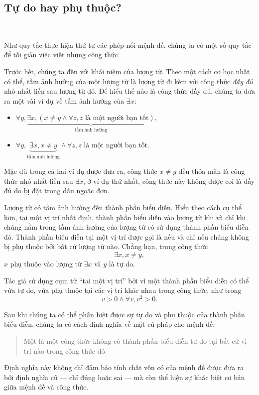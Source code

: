 \subsection{Tự do hay phụ thuộc?}

\ 

Như quy tắc thực hiện thứ tự các phép nối mệnh đề, chúng ta có một số quy tắc để tối giản việc viết những công thức.

Trước hết, chúng ta đến với khái niệm  của lượng từ. Theo một cách cơ học nhất có thể, tầm ảnh hưởng của một lượng từ là lượng từ đi kèm với công thức \emph{đầy đủ} nhỏ nhất liền sau lượng từ đó. Để hiểu thế nào là công thức đầy đủ, chúng ta đưa ra một vài ví dụ về tầm ảnh hưởng của $\exists x$:
\begin{itemize}
   \item $\forall y, \underbrace{\exists x, (x \neq y \land \forall z, z \text{ là một người bạn tốt})}_{\text{tầm ảnh hưởng}}$,
   \item $\forall y, \underbrace{\exists x, x \neq y}_{\text{tầm ảnh hưởng}} \land \forall z, z \text{ là một người bạn tốt}$.
\end{itemize}
Mặc dù trong cả hai ví dụ được đưa ra, công thức $x \neq y$ đều thỏa mãn là công thức nhỏ nhất liền sau $\exists x$, ở ví dụ thứ nhất, công thức này không được coi là đầy đủ do bị đặt trong dấu ngoặc đơn.

Lượng từ có tầm ảnh hưởng đến thành phần biểu diễn. Hiểu theo cách cụ thể hơn, tại một vị trí nhất định, thành phần biểu diễn  vào lượng từ khi và chỉ khi chúng nằm trong tầm ảnh hưởng của lượng từ có sử dụng thành phần biểu diễn đó. Thành phần biểu diễn tại một vị trí được gọi là  nếu và chỉ nếu chúng không bị phụ thuộc bởi bất cứ lượng từ nào. Chẳng hạn, trong công thức
\begin{equation*}
   \exists x, x \neq y, 
\end{equation*}
$x$ phụ thuộc vào lượng từ $\exists x$ và $y$ là tự do.

Tác giả sử dụng cụm từ ``tại một vị trí'' bởi vì một thành phần biểu diễn có thể vừa tự do, vừa phụ thuộc tại các vị trí khác nhau trong công thức, như trong
\begin{equation*}
   v > 0 \land \forall v, v^2 > 0.
\end{equation*}

Sau khi chúng ta có thể phân biệt được sự tự do và phụ thuộc của thành phần biểu diễn, chúng ta có cách định nghĩa về mặt cú pháp cho mệnh đề:
\begin{quotation}
   Một  là một công thức không có thành phần biểu diễn tự do tại bất cứ vị trí nào trong công thức đó.
\end{quotation}
Định nghĩa này không chỉ đảm bảo tính chất vốn có của mệnh đề được đưa ra bởi định nghĩa cũ --- chỉ đúng hoặc sai --- mà còn thể hiện sự khác biệt cơ bản giữa mệnh đề và công thức.


